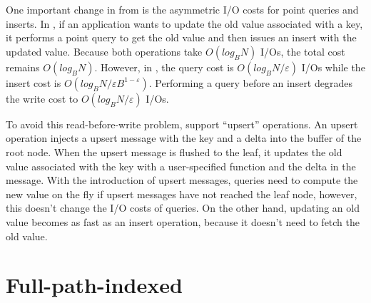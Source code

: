 One important change in \bets from \btrees is the asymmetric I/O costs for
point queries and inserts.
In \btrees, if an application wants to update the old value associated with a
key, it performs a point query to get the old value and then issues an insert
with the updated value.
Because both operations take $O(log_{B}{N})$ I/Os, the total cost remains
$O(log_{B}{N})$.
However, in \bets, the query cost is $O(log_{B}{N}/\varepsilon)$ I/Os while the
insert cost is $O({log_{B}{N}}/{\varepsilon B^{1 - \varepsilon}})$.
Performing a query before an insert degrades the write cost to
$O(log_{B}{N}/\varepsilon)$ I/Os.

To avoid this read-before-write problem, \bets support ``upsert'' operations.
An upsert operation injects a upsert message with the key and a delta into the
buffer of the root node.
When the upsert message is flushed to the leaf, it updates the old value
associated with the key with a user-specified function and the delta in the
message.
With the introduction of upsert messages, queries need to compute the new value
on the fly if upsert messages have not reached the leaf node,
however, this doesn't change the I/O costs of queries.
On the other hand, updating an old value becomes as fast as an insert operation,
because it doesn't need to fetch the old value.

\section{Full-path-indexed \betrfs}
\label{sec:fpi}

